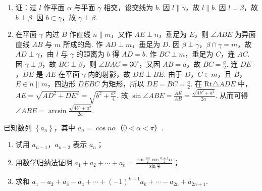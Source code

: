 \begin{solution}
\begin{enumerate}
\item 证：过 \(l\) 作平面 \(\alpha\) 与平面 \(\gamma\) 相交，设交线为 \(b\). 因 \(l \parallel \gamma\)，故 \(l \parallel b\). 因 \(l \perp \beta\)，故 \(b \perp \beta\). 因 \(b \subset \gamma\)，故 \(\gamma \perp \beta\).
\item 在平面 \(\gamma\) 内过 \(B\) 作直线 \(n \parallel m\)，又作 \(AE \perp n\)，垂足为 \(E\)，则 \(\angle ABE\) 为异面直线 \(AB\) 与 \(m\) 所成的角. 作 \(AD \perp m\)，垂足为 \(D\). 因 \(\beta \perp \gamma\)，\(\beta \cap \gamma = m\)，故 \(AD \perp \gamma\)，由 \(l\) 与 \(\gamma\) 的距离为 \(b\) 得 \(AD = b\). 作 \(BC \perp m\)，垂足为 \(C\)，连 \(AC\). 因 \(\gamma \perp \beta\)，故 \(BC \perp \beta\)，则 \(\angle BAC = 30^{\circ}\)，又因 \(AB = a\)，故 \(BC = \frac{a}{2}\). 连 \(DE\)，\(DE\) 是 \(AE\) 在平面 \(\gamma\) 内的射影，故 \(DE \perp BE\). 由于 \(D\)，\(C\in m\)，且 \(B\)，\(E\in n\parallel m\)，四边形 \(DEBC\) 为矩形，所以 \(DE=BC=\frac{a}{2}\). 在 \(\mathrm{Rt}\triangle ADE\) 中，\(AE=\sqrt{AD^{2}+DE^{2}}=\sqrt{b^{2}+\frac{a^{2}}{4}}\). 故 \(\sin\angle ABE=\frac{AE}{AB}=\frac{\sqrt{4b^{2}+a^{2}}}{2a}\). 从而可得 \(\angle ABE = \arcsin \frac{\sqrt{4b^{2} + a^{2}}}{2a}\).
\end{enumerate}
\end{solution}

\begin{problem}

已知数列 \(\left\{a_{n}\right\}\)，其中 \(a_{n}=\cos n\alpha\)（\(0<\alpha<\pi\)）.

\begin{enumerate}
\item 试用 \(a_{n-1}\)，\(a_{n-2}\) 表示 \(a_{n}\)；
\item 用数学归纳法证明 \(a_{1}+a_{2}+\cdots+a_{n}=\frac{\sin\frac{n\alpha}{2}\cos\frac{n+1}{2}\alpha}{\sin\frac{\alpha}{2}}\)；
\item 求和 \(a_{1}-a_{2}+a_{3}-a_{4}+\cdots+(-1)^{k+1}a_{k}+\cdots-a_{2n}+a_{2n+1}\).
\end{enumerate}
\end{problem}

